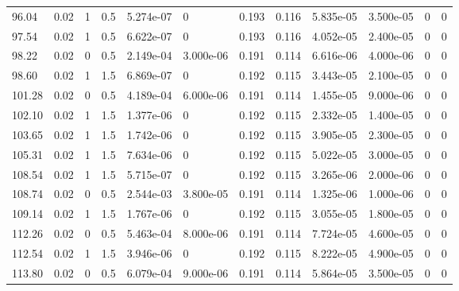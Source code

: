 \documentclass[preview]{standalone}
\begin{document}
{{{\begin{tabular}{L{1.2cm}C{1.2cm} C{0.3cm}C{0.5cm} C{1.4cm}C{1.4cm} C{1.4cm}C{1.4cm} C{1.6cm}C{1.6cm} C{1.6cm}C{1.6cm}}
  96.04  &  0.02  & 1     & 0.5 &  5.274e-07  & 0  &  0.193&   0.116& 5.835e-05 & 3.500e-05   &  0 & 0  \\ 
  97.54  &  0.02  & 1     & 0.5 &  6.622e-07  & 0  &  0.193&   0.116& 4.052e-05 & 2.400e-05   &  0 & 0  \\ 
  98.22  &  0.02  & 0     & 0.5 &  2.149e-04  & 3.000e-06  &  0.191&   0.114& 6.616e-06 & 4.000e-06   &  0 & 0  \\ 
  98.60  &  0.02  & 1     & 1.5 &  6.869e-07  & 0  &  0.192&   0.115& 3.443e-05 & 2.100e-05   &  0 & 0  \\ 
  101.28  &  0.02  & 0     & 0.5 &  4.189e-04  & 6.000e-06  &  0.191&   0.114& 1.455e-05 & 9.000e-06   &  0 & 0  \\ 
  102.10  &  0.02  & 1     & 1.5 &  1.377e-06  & 0  &  0.192&   0.115& 2.332e-05 & 1.400e-05   &  0 & 0  \\ 
  103.65  &  0.02  & 1     & 1.5 &  1.742e-06  & 0  &  0.192&   0.115& 3.905e-05 & 2.300e-05   &  0 & 0  \\ 
  105.31  &  0.02  & 1     & 1.5 &  7.634e-06  & 0  &  0.192&   0.115& 5.022e-05 & 3.000e-05   &  0 & 0  \\ 
  108.54  &  0.02  & 1     & 1.5 &  5.715e-07  & 0  &  0.192&   0.115& 3.265e-06 & 2.000e-06   &  0 & 0  \\ 
  108.74  &  0.02  & 0     & 0.5 &  2.544e-03  & 3.800e-05  &  0.191&   0.114& 1.325e-06 & 1.000e-06   &  0 & 0  \\ 
  109.14  &  0.02  & 1     & 1.5 &  1.767e-06  & 0  &  0.192&   0.115& 3.055e-05 & 1.800e-05   &  0 & 0  \\ 
  112.26  &  0.02  & 0     & 0.5 &  5.463e-04  & 8.000e-06  &  0.191&   0.114& 7.724e-05 & 4.600e-05   &  0 & 0  \\ 
  112.54  &  0.02  & 1     & 1.5 &  3.946e-06  & 0  &  0.192&   0.115& 8.222e-05 & 4.900e-05   &  0 & 0  \\ 
  113.80  &  0.02  & 0     & 0.5 &  6.079e-04  & 9.000e-06  &  0.191&   0.114& 5.864e-05 & 3.500e-05   &  0 & 0  \\ 
\hline 
\end{tabular} 

}}}
\end{document}
